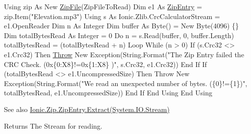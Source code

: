 \begin{DoxyCode}
Using zip As New \mbox{\hyperlink{namespace_super_tiled2_unity_1_1_ionic_1_1_zip_a9ced5352c56e7e0fceff15b534073c83a088ad16b06174c69965e232063ba6d16}{ZipFile}}(ZipFileToRead)
    Dim e1 As \mbox{\hyperlink{class_super_tiled2_unity_1_1_ionic_1_1_zip_1_1_zip_entry_a440b6d4d136b20dc6bdbdd399397e3a0}{ZipEntry}} = zip.Item(\textcolor{stringliteral}{"Elevation.mp3"})
    Using s As Ionic.Zlib.CrcCalculatorStream = e1.OpenReader
        Dim n As Integer
        Dim buffer As Byte() = New Byte(4096) \{\}
        Dim totalBytesRead As Integer = 0
        Do
            n = s.Read(buffer, 0, buffer.Length)
            totalBytesRead = (totalBytesRead + n)
        Loop While (n > 0)
        If (s.Crc32 <> e1.Crc32) Then
            \mbox{\hyperlink{namespace_super_tiled2_unity_1_1_ionic_1_1_zip_a3f8db7242d746d36b45114257b4fe4c0a8ce61dd2505effd96f937fa743b6491f}{Throw}} New Exception(String.Format("The Zip Entry failed the CRC Check. (0x\{0:X8\}!=0x\{1:X8\}
      )\textcolor{stringliteral}{", s.Crc32, e1.Crc32))}
\textcolor{stringliteral}{        End If}
\textcolor{stringliteral}{        If (totalBytesRead <> e1.UncompressedSize) Then}
\textcolor{stringliteral}{            Throw New Exception(String.Format("}We read an unexpected number of bytes. (\{0\}!=\{1\})\textcolor{stringliteral}{",
       totalBytesRead, e1.UncompressedSize))}
\textcolor{stringliteral}{        End If}
\textcolor{stringliteral}{    End Using}
\textcolor{stringliteral}{End Using}
\end{DoxyCode}
 

\begin{DoxySeeAlso}{See also}
\mbox{\hyperlink{class_super_tiled2_unity_1_1_ionic_1_1_zip_1_1_zip_entry_a13e055aec36ff9eb116526778dd413fe}{Ionic.\+Zip.\+Zip\+Entry.\+Extract(\+System.\+I\+O.\+Stream)}}


\end{DoxySeeAlso}
\begin{DoxyReturn}{Returns}
The Stream for reading.
\end{DoxyReturn}
\mbox{\label{class_super_tiled2_unity_1_1_ionic_1_1_zip_1_1_zip_entry_ab85b4a5dd2d9b10e53a63b34c77cac83}} 
